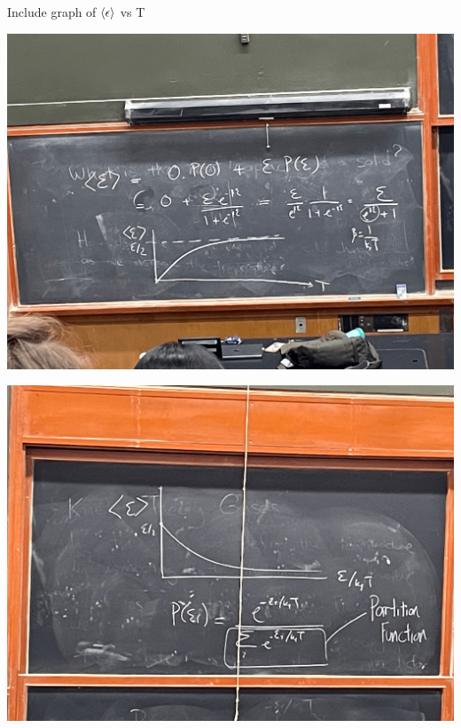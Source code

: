 \documentclass[11pt]{article}
\begin{document}
\begin{note}
  {Include graph of $\langle \epsilon \rangle$ vs T}
\end{note}
\begin{center}
  \includegraphics*[scale=0.05]{pictures/aug 28/IMG_3493-min.png}
\end{center}



\begin{center}
  \includegraphics*[scale=0.05]{pictures/aug 28/IMG_3494-min.png}
\end{center}
\end{document}
